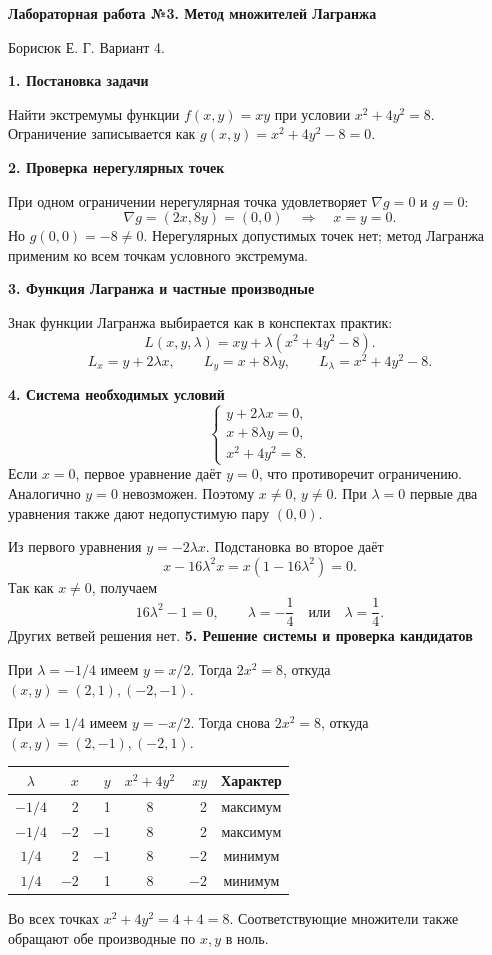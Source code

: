 \documentclass[12pt,a4paper]{article}
\begin{document}
\begin{center}\large\textbf{Лабораторная работа №3. Метод множителей Лагранжа}\end{center}
Борисюк Е. Г. Вариант 4.

\textbf{1. Постановка задачи}

Найти экстремумы функции $f(x,y)=xy$ при условии $x^2+4y^2=8$.
Ограничение записывается как $g(x,y)=x^2+4y^2-8=0$.

\textbf{2. Проверка нерегулярных точек}

При одном ограничении нерегулярная точка удовлетворяет $\nabla g=0$ и $g=0$:
\[\nabla g=(2x,8y)=(0,0)\quad\Longrightarrow\quad x=y=0.\]
Но $g(0,0)=-8\ne0$. Нерегулярных допустимых точек нет; метод Лагранжа
применим ко всем точкам условного экстремума.

\textbf{3. Функция Лагранжа и частные производные}

Знак функции Лагранжа выбирается как в конспектах практик:
\[L(x,y,\lambda)=xy+\lambda(x^2+4y^2-8).\]
\[L_x=y+2\lambda x,\qquad L_y=x+8\lambda y,\qquad L_\lambda=x^2+4y^2-8.\]

\textbf{4. Система необходимых условий}
\[\begin{cases}y+2\lambda x=0,\\x+8\lambda y=0,\\x^2+4y^2=8.\end{cases}\]
Если $x=0$, первое уравнение даёт $y=0$, что противоречит ограничению.
Аналогично $y=0$ невозможен. Поэтому $x\ne0$, $y\ne0$.
При $\lambda=0$ первые два уравнения также дают недопустимую пару $(0,0)$.

Из первого уравнения $y=-2\lambda x$. Подстановка во второе даёт
\[x-16\lambda^2x=x(1-16\lambda^2)=0.\]
Так как $x\ne0$, получаем
\[16\lambda^2-1=0,\qquad \lambda=-\frac14\quad\text{или}\quad\lambda=\frac14.\]
Других ветвей решения нет.
\newpage
\textbf{5. Решение системы и проверка кандидатов}

При $\lambda=-1/4$ имеем $y=x/2$. Тогда $2x^2=8$, откуда
$(x,y)=(2,1),(-2,-1)$.

При $\lambda=1/4$ имеем $y=-x/2$. Тогда снова $2x^2=8$, откуда
$(x,y)=(2,-1),(-2,1)$.

\begin{center}
\begin{tabular}{c|r|r|c|r|c}
$\lambda$ & $x$ & $y$ & $x^2+4y^2$ & $xy$ & Характер\\\hline
$-1/4$ & 2 & 1 & 8 & 2 & максимум\\
$-1/4$ & $-2$ & $-1$ & 8 & 2 & максимум\\
$1/4$ & 2 & $-1$ & 8 & $-2$ & минимум\\
$1/4$ & $-2$ & 1 & 8 & $-2$ & минимум
\end{tabular}
\end{center}
Во всех точках $x^2+4y^2=4+4=8$. Соответствующие множители также
обращают обе производные по $x,y$ в ноль.
\end{document}
